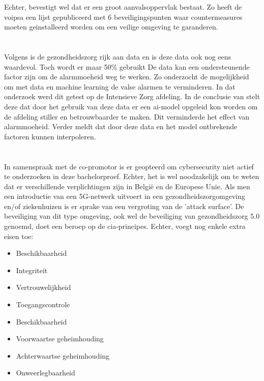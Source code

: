 Echter, \textcite{Soenmez2018} bevestigt wel dat er een groot aanvalsoppervlak bestaat. Zo heeft de \gls{voipsa} een lijst gepubliceerd met 6 beveiligingspunten waar countermeasures moeten geinstalleerd worden om een veilige omgeving te garanderen.

\section{}%
\label{sec:data}%

Volgens \textcite{Niekerk2020} is de gezondheidszorg rijk aan data en is deze data ook nog eens waardevol. Toch wordt er maar 50\% gebruikt 
De data kan een ondersteunende factor zijn om de alarmmoeheid weg te werken. Zo onderzocht \textcite{Hever2019} de mogelijkheid om met data en machine learning de valse alarmen te verminderen. In dat onderzoek werd dit getest op de Intensieve Zorg afdeling. In de conclusie van \textcite{Hever2019} stelt deze dat door het gebruik van deze data er een \gls{ai}-model opgeleid kon worden om de afdeling stiller en betrouwbaarder te maken. Dit verminderde het effect van alarmmoeheid. Verder meldt \textcite{Hever2019} dat door deze data en het model  ontbrekende factoren kunnen interpoleren.

\section{}%
\label{sec:security}%

In samenspraak met de co-promotor is er geopteerd om cybersecurity niet actief te onderzoeken in deze bachelorproef. Echter, het is wel noodzakelijk om te weten dat er verschillende verplichtingen zijn in België en de Europese Unie. Als men een introductie van een 5G-netwerk uitvoert in een gezondheidszorgomgeving en/of ziekenhuizen is er sprake van een vergroting van de 'attack surface'. De beveiliging van dit type omgeving, ook wel de beveiliging van gezondheidszorg 5.0 genoemd, doet een beroep op de \gls{cia}-principes. Echter, \textcite{Wazid2022} voegt nog enkele extra eisen toe:

\begin{itemize}
  \item Beschikbaarheid
  \item Integriteit
  \item Vertrouwelijkheid
  \item Toegangscontrole
  \item Beschikbaarheid
  \item Voorwaartse geheimhouding
  \item Achterwaartse geheimhouding
  \item Onweerlegbaarheid
\end{itemize}

